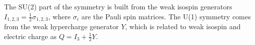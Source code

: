
The SU(2) part of the symmetry is built from the weak
isospin generators $I_{1,2,3} = \frac{1}{2}\sigma_{1,2,3}$,
where $\sigma_i$ are the Pauli spin matrices. The U(1)
symmetry comes from the weak hypercharge generator $Y$, which
is related to weak isospin and electric charge as $Q = I_3 + \frac{1}{2}Y$.


